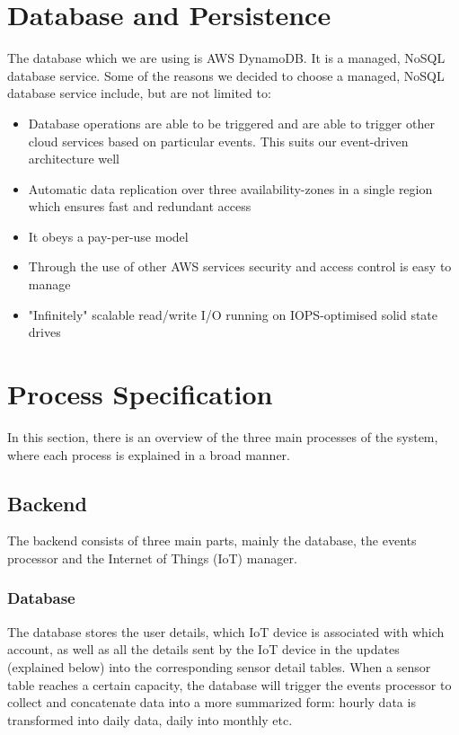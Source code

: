 \documentclass{article}
\begin{document}
\section{Database and Persistence}
	The database which we are using is AWS DynamoDB. It is a managed, NoSQL database service. Some of the reasons we decided to choose a managed, NoSQL database service include, but are not limited to:
	\begin{itemize}
		\item Database operations are able to be triggered and are able to trigger other cloud services based on particular events. This suits our event-driven architecture well
		\item Automatic data replication over three availability-zones in a single region which ensures fast and redundant access
		\item It obeys a pay-per-use model
		\item Through the use of other AWS services security and access control is easy to manage
		\item "Infinitely" scalable read/write I/O running on IOPS-optimised solid state drives
	\end{itemize}

\section{Process Specification}
	In this section, there is an overview of the three main processes of the system, where each process is explained in a broad manner.
	
	\subsection{Backend}
		The backend consists of three main parts, mainly the database, the events processor and the Internet of Things (IoT) manager.
		
		\subsubsection{Database}
			The database stores the user details, which IoT device is associated with which account, as well as all the details sent by the IoT device in the updates (explained below) into the corresponding sensor detail tables. When a sensor table reaches a certain capacity, the database will trigger the events processor to collect and concatenate data into a more summarized form: hourly data is transformed into daily data, daily into monthly etc.
		
\end{document}
